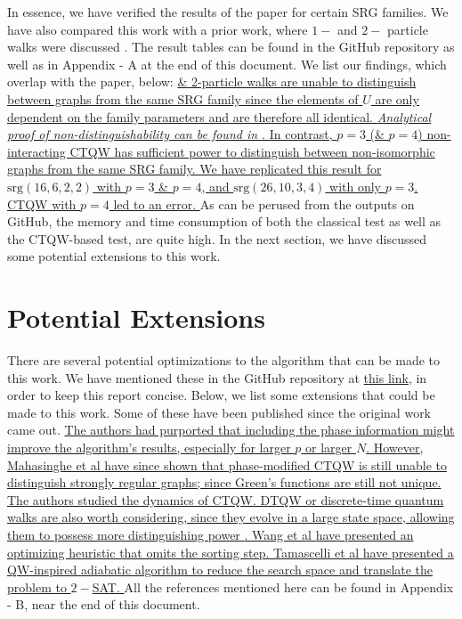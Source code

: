 \documentclass[twocolumn,a4paper,english,10pt]{article}
\begin{document}
In essence, we have verified the results of the paper for certain SRG families. We have also compared this work 
with a prior work, where $1-$ and $2-$ particle walks were discussed \cite{main2}. The result tables can be found in the GitHub repository as well as in 
Appendix - A at the end of this document. We list our findings, which overlap with the paper, below:
\ul{
     \& 2-particle walks are unable to distinguish between graphs from the same
    SRG family since the elements of $U$ are only dependent on the family parameters 
    and are therefore all identical. \textit{Analytical proof of non-distinguishability can be found in \cite{proof}}.
    \1 In contrast, $p = 3$ (\& $p = 4$) non-interacting CTQW has sufficient power to distinguish between 
    non-isomorphic graphs from the same SRG family. We have replicated this result for $\text{srg}(16, 6, 2, 2)$ with 
    $p = 3$ & $p = 4$, and $\text{srg}(26, 10, 3, 4)$ with only $p = 3$. CTQW with $p = 4$ led to an  error.
}
As can be perused from the outputs on GitHub, the memory and time consumption of both the classical test as well as the CTQW-based test, are quite high.
In the next section, we have discussed some potential extensions to this work.

\section{Potential Extensions}
There are several potential optimizations to the algorithm that can be made to this work. We have mentioned these in the 
GitHub repository at \href{https://github.com/JeS24/CTQW-graph-isomorphism#potential-optimizations-for-the-implementation}{this link}, 
in order to keep this report concise. Below, we list some extensions that could be made to this work. Some of these have been published since 
the original work came out.
\ul {
    \1 The authors had purported that including the phase information might improve the
    algorithm's results, especially for larger $p$ or larger $N$. However, Mahasinghe et al \cite{maha} 
    have since shown that phase-modified CTQW is still unable to distinguish strongly regular
    graphs; since Green's functions are still not unique.
    \1 The authors studied the dynamics of CTQW. DTQW or discrete-time quantum walks are also worth considering,
    since they evolve in a large state space, allowing them to possess more distinguishing power \cite{main3}.
    \1 Wang et al \cite{wang} have presented an optimizing heuristic that omits the sorting step.
    \1 Tamascelli et al \cite{tama} have presented a QW-inspired adiabatic algorithm to reduce the search
    space and translate the problem to $2-$SAT.
}
All the references mentioned here can be found in Appendix - B, near the end of this document.
\end{document}
